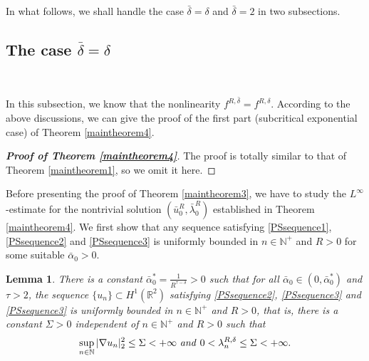 \documentclass[11pt]{amsart}
\numberwithin{equation}{section}
\newtheorem{lemma}[theorem]{Lemma}
\theoremstyle{definition}
\newcommand{\R}{\mathbb{R}}
\begin{document}
In what follows, we shall handle the case $\bar{\delta}=\delta$
and $\bar{\delta}=2$ in two subsections.

\subsection{The case $\bar{\delta}=\delta$}\label{subcritical}\

In this subsection, we know that the nonlinearity $f^{R,\bar{\delta}}=f^{R,\delta}$.
According to the above discussions,
we can give the proof of the first part (subcritical exponential case) of Theorem \ref{maintheorem4}.

\begin{proof}[\textbf{\emph{Proof of Theorem \ref{maintheorem4}}}]
The proof is totally similar to that of Theorem \ref{maintheorem1},
so we omit it here.
\end{proof}

Before presenting the proof of Theorem \ref{maintheorem3},
we have to study the $L^\infty$-estimate for the nontrivial solution $(\bar{u}_0^R,\bar{\lambda}_0^R)$
established in Theorem \ref{maintheorem4}.
We first show that any sequence satisfying
\eqref{PSsequence1}, \eqref{PSsequence2} and \eqref{PSsequence3} is uniformly bounded in $n\in \mathbb{N}^+$ and $R>0$
 for some suitable $\bar{\alpha}_0>0$.

\begin{lemma}\label{10bounded}
 There is a constant
 $\bar{\alpha}_0^*=\frac{1}{R^{\tau-\delta}}>0$ such that for all $\bar{\alpha}_0\in(0,\bar{\alpha}_0^*)$ and $\tau>2$,
the sequence $\{u_n\}\subset H^1(\R^2)$ satisfying \eqref{PSsequence2}, \eqref{PSsequence3} and \eqref{PSsequence3} is uniformly bounded in $n\in \mathbb{N}^+$
and $R>0$, that is,
there is a constant $\Sigma>0$ independent of $n\in \mathbb{N}^+$ and $R>0$ such that
\begin{equation}\label{10bounded01}
\sup_{n\in \mathbb{N}}|\nabla u_n |_{2}^2\leq\Sigma<+\infty~\text{\emph{and}}~0<\lambda_n^{R,\delta}\leq \Sigma<+\infty.
\end{equation}
\end{lemma}
\end{document}
